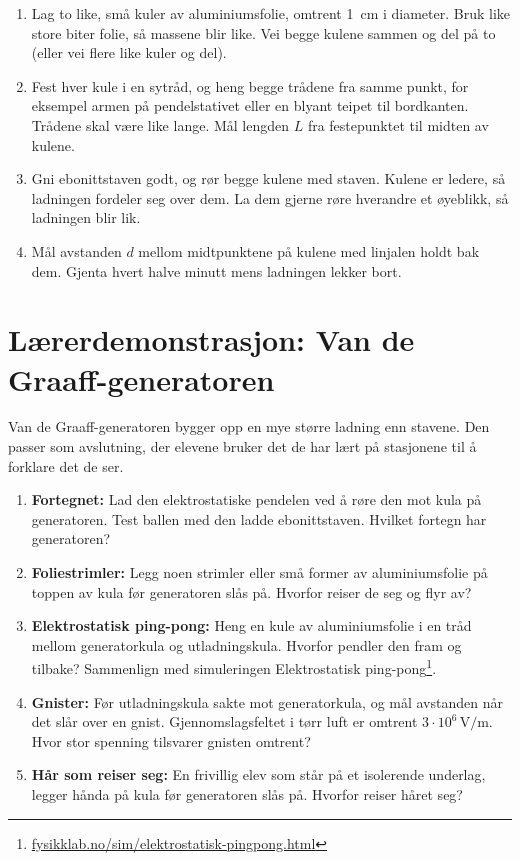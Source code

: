 \documentclass[11pt]{article}
\begin{document}
\begin{enumerate}
\item Lag to like, små kuler av aluminiumsfolie, omtrent 1~cm i diameter. Bruk like store biter folie, så massene blir like. Vei begge kulene sammen og del på to (eller vei flere like kuler og del).
\item Fest hver kule i en sytråd, og heng begge trådene fra samme punkt, for eksempel armen på pendelstativet eller en blyant teipet til bordkanten. Trådene skal være like lange. Mål lengden $L$ fra festepunktet til midten av kulene.
\item Gni ebonittstaven godt, og rør begge kulene med staven. Kulene er ledere, så ladningen fordeler seg over dem. La dem gjerne røre hverandre et øyeblikk, så ladningen blir lik.
\item Mål avstanden $d$ mellom midtpunktene på kulene med linjalen holdt bak dem. Gjenta hvert halve minutt mens ladningen lekker bort.
\end{enumerate}

\section*{Lærerdemonstrasjon: Van de Graaff-generatoren}

Van de Graaff-generatoren bygger opp en mye større ladning enn stavene. Den passer som avslutning, der elevene bruker det de har lært på stasjonene til å forklare det de ser.

\begin{enumerate}
\item \textbf{Fortegnet:} Lad den elektrostatiske pendelen ved å røre den mot kula på generatoren. Test ballen med den ladde ebonittstaven. Hvilket fortegn har generatoren?
\item \textbf{Foliestrimler:} Legg noen strimler eller små former av aluminiumsfolie på toppen av kula før generatoren slås på. Hvorfor reiser de seg og flyr av?
\item \textbf{Elektrostatisk ping-pong:} Heng en kule av aluminiumsfolie i en tråd mellom generatorkula og utladningskula. Hvorfor pendler den fram og tilbake? Sammenlign med simuleringen Elektrostatisk ping-pong\footnote{\url{fysikklab.no/sim/elektrostatisk-pingpong.html}}.
\item \textbf{Gnister:} Før utladningskula sakte mot generatorkula, og mål avstanden når det slår over en gnist. Gjennomslagsfeltet i tørr luft er omtrent $3 \cdot 10^{6}\,\mathrm{V/m}$. Hvor stor spenning tilsvarer gnisten omtrent?
\item \textbf{Hår som reiser seg:} En frivillig elev som står på et isolerende underlag, legger hånda på kula før generatoren slås på. Hvorfor reiser håret seg?
\end{enumerate}
\end{document}
